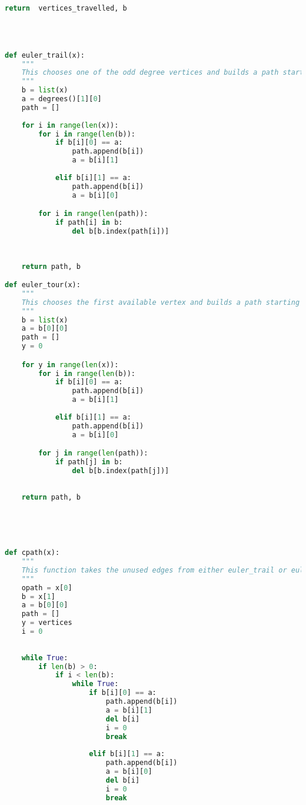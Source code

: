 \documentclass{article}
\begin{document}
\begin{lstlisting}[language=Python]
    return  vertices_travelled, b


    

def euler_trail(x):
    """
    This chooses one of the odd degree vertices and builds a path starting from there.
    """
    b = list(x)
    a = degrees()[1][0]
    path = []
    
    for i in range(len(x)): 
        for i in range(len(b)):
            if b[i][0] == a:
                path.append(b[i])
                a = b[i][1]
                
            elif b[i][1] == a:
                path.append(b[i])
                a = b[i][0]

        for i in range(len(path)):
            if path[i] in b:
                del b[b.index(path[i])]
                
        
        
    return path, b

def euler_tour(x):
    """
    This chooses the first available vertex and builds a path starting from there by always choosing an unused edge.
    """
    b = list(x)
    a = b[0][0]
    path = []
    y = 0

    for y in range(len(x)): 
        for i in range(len(b)):
            if b[i][0] == a:
                path.append(b[i])
                a = b[i][1]
                
            elif b[i][1] == a:
                path.append(b[i])
                a = b[i][0]

        for j in range(len(path)):
            if path[j] in b:
                del b[b.index(path[j])]
        
        
    return path, b



        
    
def cpath(x):
    """
    This function takes the unused edges from either euler_trail or euler_tour and makes a new path.
    """
    opath = x[0]
    b = x[1]
    a = b[0][0]
    path = []
    y = vertices
    i = 0
    
   
    while True:
        if len(b) > 0:
            if i < len(b):
                while True: 
                    if b[i][0] == a:
                        path.append(b[i])
                        a = b[i][1]
                        del b[i]
                        i = 0
                        break
                
                    elif b[i][1] == a:
                        path.append(b[i])
                        a = b[i][0]
                        del b[i]
                        i = 0
                        break


\end{lstlisting}
\end{document}
